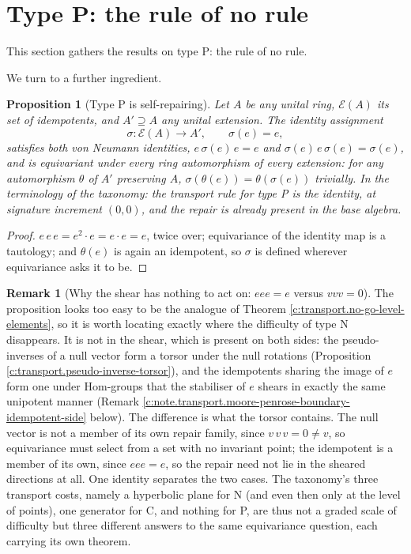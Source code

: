 \documentclass[11pt]{article}
\newtheorem{proposition}[theorem]{Proposition}
\theoremstyle{definition}
\newtheorem{remark}[theorem]{Remark}
\theoremstyle{plain}
\begin{document}
\section{Type P: the rule of no rule}

This section gathers the results on type P: the rule of no rule.

We turn to a further ingredient.

\begin{proposition}[Type P is self-repairing]\label{c:transport.type-p-self-repairing}
Let $A$ be any unital ring, $\mathcal{E}(A)$ its set of idempotents, and $A' \supseteq A$ any unital extension. The identity assignment
\[
\sigma : \mathcal{E}(A) \to A' , \qquad \sigma(e) = e,
\]
satisfies both von Neumann identities, $e\,\sigma(e)\,e = e$ and $\sigma(e)\,e\,\sigma(e) = \sigma(e)$, and is equivariant under \emph{every} ring automorphism of every extension: for any automorphism $\theta$ of $A'$ preserving $A$, $\sigma(\theta(e)) = \theta(\sigma(e))$ trivially. In the terminology of the taxonomy: the transport rule for type P is the identity, at signature increment $(0,0)$, and the repair is already present in the base algebra.
\end{proposition}
\begin{proof}
$e\,e\,e = e^2 \cdot e = e \cdot e = e$, twice over; equivariance of the identity map is a tautology; and $\theta(e)$ is again an idempotent, so $\sigma$ is defined wherever equivariance asks it to be.

\end{proof}

\begin{remark}[Why the shear has nothing to act on: $eee = e$ versus $vvv = 0$]\label{c:note.transport.why-shear-has-nothing-act-eee}
The proposition looks too easy to be the analogue of Theorem \ref{c:transport.no-go-level-elements}, so it is worth locating exactly where the difficulty of type N disappears. It is not in the shear, which is present on both sides: the pseudo-inverses of a null vector form a torsor under the null rotations (Proposition \ref{c:transport.pseudo-inverse-torsor}), and the idempotents sharing the image of $e$ form one under $\mathrm{Hom}$-groups that the stabiliser of $e$ shears in exactly the same unipotent manner (Remark \ref{c:note.transport.moore-penrose-boundary-idempotent-side} below). The difference is what the torsor contains. The null vector is not a member of its own repair family, since $v\,v\,v = 0 \neq v$, so equivariance must select from a set with no invariant point; the idempotent is a member of its own, since $eee = e$, so the repair need not lie in the sheared directions at all. One identity separates the two cases. The taxonomy's three transport costs, namely a hyperbolic plane for N (and even then only at the level of points), one generator for C, and nothing for P, are thus not a graded scale of difficulty but three different answers to the same equivariance question, each carrying its own theorem.
\end{remark}
\end{document}
